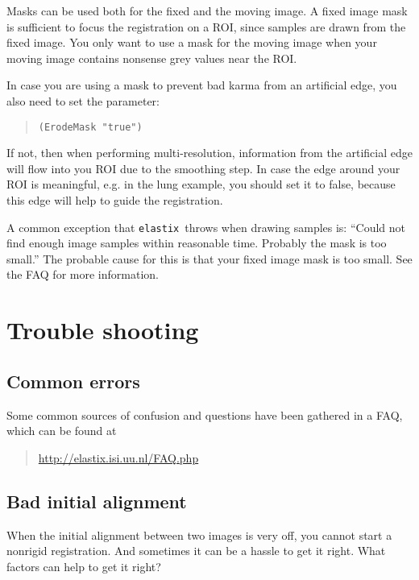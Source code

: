 \documentclass[]{report}
\newcommand{\elastix}{\texttt{elastix}}
\begin{document}
Masks can be used both for the fixed and the moving image. A fixed
image mask is sufficient to focus the registration on a ROI, since
samples are drawn from the fixed image. You only want to use a
mask for the moving image when your moving image contains nonsense
grey values near the ROI.

In case you are using a mask to prevent bad karma from an artificial
edge, you also need to set the parameter:
\begin{quote}
\texttt{(ErodeMask "true")}
\end{quote}
If not, then when performing multi-resolution, information from the
artificial edge will flow into you ROI due to the smoothing step. In
case the edge around your ROI is meaningful, e.g. in the lung
example, you should set it to false, because this edge will help to
guide the registration.

A common exception that \elastix\ throws when drawing samples is:
``Could not find enough image samples within reasonable time.
Probably the mask is too small.'' The probable cause for this is
that your fixed image mask is too small. See the FAQ for more
information.

\section{Trouble shooting}

\subsection{Common errors}

Some common sources of confusion and questions have been gathered in
a FAQ, which can be found at
\begin{quote}
\url{http://elastix.isi.uu.nl/FAQ.php}
\end{quote}

\subsection{Bad initial alignment}

When the initial alignment between two images is very off, you cannot
start a nonrigid registration. And sometimes it can be a hassle to
get it right. What factors can help to get it right?
\end{document}
